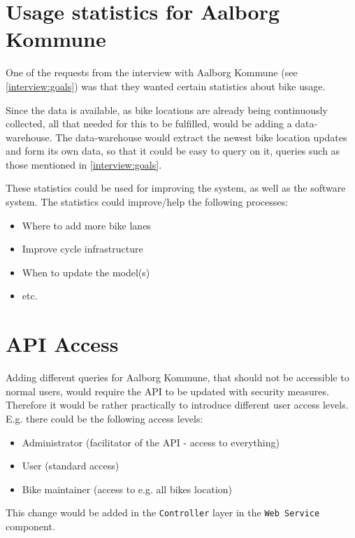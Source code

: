 \section{Usage statistics for Aalborg Kommune}
One of the requests from the interview with Aalborg Kommune (see \cref{interview:goals}) was that they wanted certain statistics about bike usage.

Since the data is available, as bike locations are already being continuously collected, all that needed for this to be fulfilled, would be adding a data-warehouse.
The data-warehouse would extract the newest bike location updates and form its own data, so that it could be easy to query on it, queries such as those mentioned in \cref{interview:goals}.

These statistics could be used for improving the \citybike system, as well as the software system.
The statistics could improve/help the following processes:
\begin{itemize}
\item Where to add more bike lanes
\item Improve cycle infrastructure
\item When to update the model(s)
\item etc.
\end{itemize}

\section{API Access}
Adding different queries for Aalborg Kommune, that should not be accessible to normal users, would require the API to be updated with security measures.
Therefore it would be rather practically to introduce different user access levels.
E.g. there could be the following access levels:
\begin{itemize}
\item Administrator (facilitator of the API - access to everything)
\item User (standard access)
\item Bike maintainer (access to e.g. all bikes location)
\end{itemize}
This change would be added in the \texttt{Controller} layer in the \texttt{Web Service} component.
